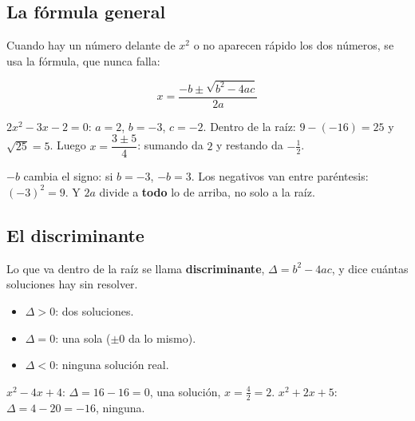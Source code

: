 \subsection{La fórmula general}
Cuando hay un número delante de $x^2$ o no aparecen rápido los dos números, se usa la fórmula, que nunca falla:
\begin{clave} $$x = \frac{-b \pm \sqrt{b^2 - 4ac}}{2a}$$\end{clave}
\begin{ejemplo} $2x^2 - 3x - 2 = 0$: $a = 2$, $b = -3$, $c = -2$. Dentro de la raíz: $9 - (-16) = 25$ y $\sqrt{25} = 5$. Luego $x = \dfrac{3 \pm 5}{4}$: sumando da $2$ y restando da $-\frac{1}{2}$.\end{ejemplo}
\begin{ojo} $-b$ cambia el signo: si $b = -3$, $-b = 3$. Los negativos van entre paréntesis: $(-3)^2 = 9$. Y $2a$ divide a \textbf{todo} lo de arriba, no solo a la raíz.\end{ojo}

\subsection{El discriminante}
Lo que va dentro de la raíz se llama \textbf{discriminante}, $\Delta = b^2 - 4ac$, y dice cuántas soluciones hay sin resolver.
\par\noindent\begin{minipage}{0.55\linewidth}
\begin{clave}
\begin{itemize}
  \item $\Delta > 0$: dos soluciones.
  \item $\Delta = 0$: una sola ($\pm 0$ da lo mismo).
  \item $\Delta < 0$: ninguna solución real.
\end{itemize}
\end{clave}
\begin{ejemplo} $x^2 - 4x + 4$: $\Delta = 16 - 16 = 0$, una solución, $x = \frac{4}{2} = 2$. $x^2 + 2x + 5$: $\Delta = 4 - 20 = -16$, ninguna.\end{ejemplo}
\end{minipage}\hfill
\begin{minipage}{0.4\linewidth}\centering
{}
\end{minipage}


